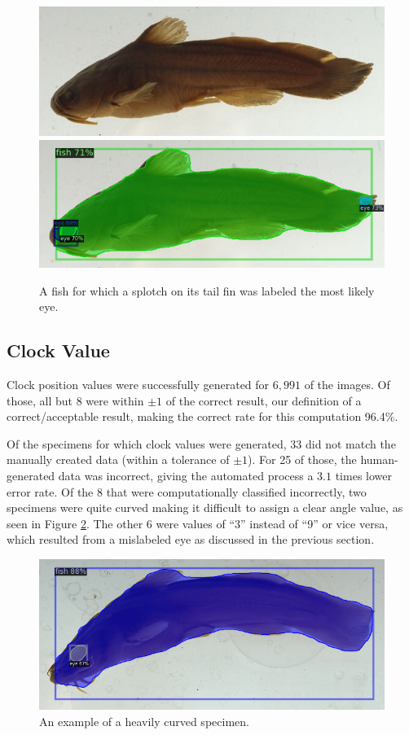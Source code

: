 \documentclass[conference]{IEEEtran}
\begin{document}
\begin{figure}[H]
  \centering
  \includegraphics[width=0.49\linewidth]{images/wrong_side_orig}
  \includegraphics[width=0.49\linewidth]{images/wrong_side1}
  \caption{A fish for which a splotch on its tail fin was labeled the most likely eye.}
  \label{fig:wrong_eye}
\end{figure}

\subsection{Clock Value}
Clock position values were successfully generated for \(6,991\) of the images. Of those, all but 8 were within \(\pm{}1\) of the correct result,
our definition of a correct/acceptable result, making the correct rate for
this computation 96.4\%.

Of the specimens for which clock values were generated, 33 did not match the manually created data (within a tolerance of \(\pm{}1\)).
For 25 of those, the human-generated data was incorrect, giving the automated process a \(3.1\) times lower error rate. Of the 8 that were
computationally classified incorrectly,
two specimens were quite curved making it difficult to assign a clear angle value, as
seen in Figure \ref{fig:curvedFish}.
The other 6 were values of ``3'' instead of ``9'' or vice versa, which resulted from
a mislabeled eye as discussed in the previous section.

\begin{figure}[H]
  \centering
  \includegraphics[width=0.7\linewidth]{images/curved1}
  \caption{An example of a heavily curved specimen.}
  \label{fig:curvedFish}
\end{figure}
\end{document}
